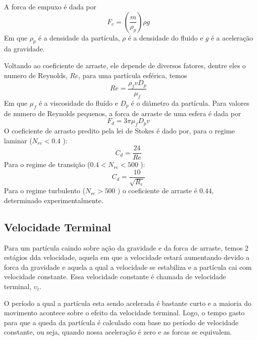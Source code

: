 A forca de empuxo é dada por
\begin{equation}\label{eq: forca de empuxo}
    F_e = \left( \frac{m}{\rho_p} \right) \rho g
\end{equation}
Em que \(\rho_p\) é a densidade da partícula, \(\rho\) é a densidade do fluido e \(g\) é a
aceleração da gravidade. \par

Voltando ao coeficiente de arraste, ele depende de diversos fatores, dentre eles o numero de
Reynolds, \(Re\), para uma partícula esférica, temos
\begin{equation}
    Re = \frac{\rho_f v D_p}{\mu_f}
\end{equation}
Em que \(\mu_f\) é a viscosidade do fluído e \(D_p\) é o diâmetro da partícula. Para valores de
numero de Reynolds pequenos, a forca de arraste de uma esfera é dada por 
\begin{equation}
    F_d = 3 \pi \mu_f D_p v
\end{equation}
O coeficiente de arrasto predito pela lei de Stokes é dado por, para o regime laminar (\(N_{re} <
0.4 \) ):
\begin{equation}
    C_d = \frac{24}{Re}
\end{equation}
Para o regime de transição (\(0.4 < N_{re} < 500 \) ):
\begin{equation}
    C_d = \frac{10}{\sqrt{R_e}}
\end{equation}
Para o regime turbulento (\(N_{re} > 500\) ) o coeficiente de arraste é  \(0.44\), determinado
experimentalmente. \par 
\subsection{Velocidade Terminal}
Para um partícula caindo sobre ação da gravidade e da forca de arraste, temos 2 estágios dda
velocidade, aquela em  que a velocidade estará aumentando devido a forca da gravidade e aquela a
qual a velocidade se estabiliza e a partícula cai com velocidade constante. Essa velocidade
constante é chamada de velocidade terminal, \(\upsilon _t\). \par 

O período a qual a partícula esta sendo acelerada é bastante curto e a maioria do movimento acontece
sobre o efeito da velocidade terminal. Logo, o tempo gasto para que a queda da partícula é calculado
com base no período de velocidade constante, ou seja, quando nossa aceleração é zero e as forcas se
equivalem. \par

